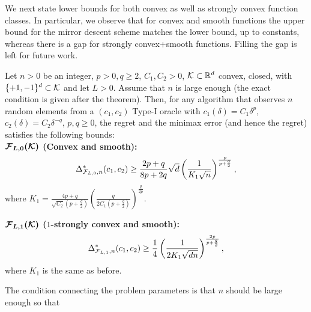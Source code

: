 We next state lower bounds for both convex as well as strongly convex function classes. In particular, we observe that for convex and smooth functions the upper bound for the mirror descent scheme matches the lower bound, up to constants, whereas there is a gap for strongly convex+smooth functions.
Filling the gap is left for future work.
\begin{theorem}
\label{thm:lb-convex}
Let $n>0$ be an integer, $p>0, q\ge 2$, $C_1,C_2>0$, 
$\mathcal{K}\subset \mathbb{R}^d$ convex, closed, with  $\{+1,-1\}^d\subset \mathcal{K}$ and let $L>0$.
Assume that $n$ is large enough (the exact condition is given after the theorem). 
Then, for any algorithm that observes $n$ random elements from a $(c_1,c_2)$ Type-I oracle 
 with $c_1(\delta) = C_1 \delta^p$, $c_2(\delta) = C_2 \delta^{-q}$, $p,q\ge 0$,
 the regret and the minimax error (and hence the regret) satisfies the following bounds:\\
\textbf{$\bm{\mathcal{F}_{L,0}(\mathcal{K})}$ (Convex and smooth):}
\[
 \Delta_{\mathcal{F}_{L,0},n}^{*}(c_1,c_2) \ge \dfrac{2p+q}{8p+2q}\sqrt{d}\left(\dfrac{1}{ K_1 \sqrt n}\right)^{\frac{p}{p+\frac{q}{2}}},
\]
where $K_1 =\frac{4p+q}{\sqrt{C_2}(p+\tfrac{q}{2})} \left(\frac{q}{2C_1(p+\tfrac{q}{2})}\right)^{\frac{q}{2p}}$.

\textbf{$\bm{\mathcal{F}_{L,1}(\mathcal{K})}$ ($1$-strongly convex and smooth):}
\[
\Delta_{\mathcal{F}_{L,1}, n}^{*}(c_1,c_2) \ge \dfrac{1}{4}  \left(\dfrac{1}{2 K_1 \sqrt {d n}}\right)^{\frac{2p}{p+\frac{q}{2}}}, 
\]
where $K_1$ is the same as before.
\end{theorem}
The condition connecting the problem parameters is that $n$ should be large enough so that\\
